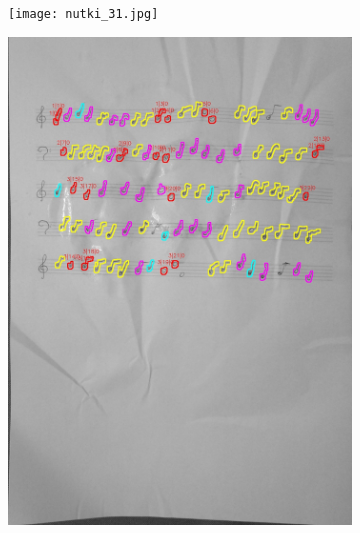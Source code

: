 \documentclass[11pt]{article}
\begin{document}
\begin{figure}[H]
    \centering
    \begin{subfigure}{.5\textwidth}
        \centering
        \graphicspath{ {Resources/} }
        \texttt{[image: nutki\_31.jpg]}
        \label{fig:sub1}
    \end{subfigure}%
    \begin{subfigure}{.5\textwidth}
        \centering
        \graphicspath{ {blobs/} }
        \includegraphics[width=\linewidth]{31_cnts.jpg}
        \label{fig:sub2}
    \end{subfigure}
    \label{fig:test}
\end{figure}
\end{document}
